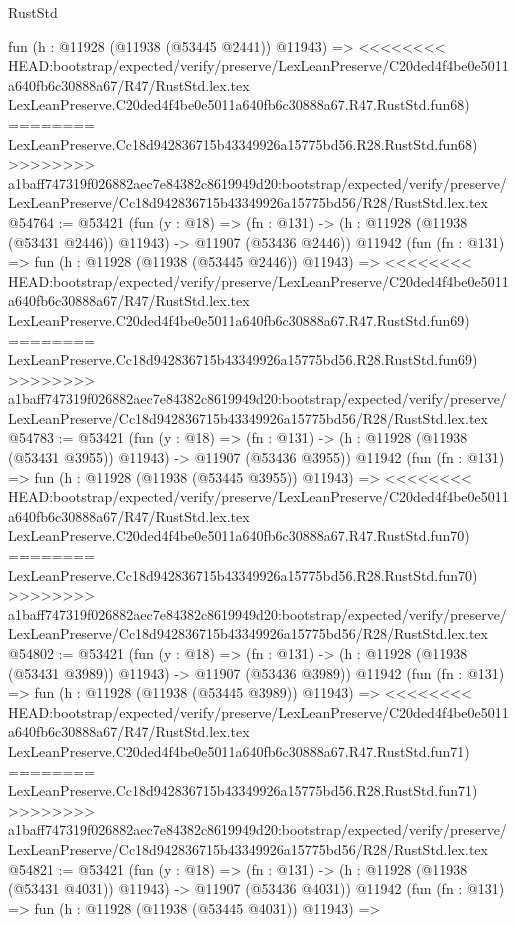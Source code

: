 \begin{lexlean}{RustStd}
\begin{coremodule}
{\begin{coremodule}
{{{{{{{{{{{{{{{{{{{{{{{{{{{{{{{{{{{{{{{{{{{{{{{{{{{{{{{{{{{{{{{{{{{{{{{{{{{{{{{{    fun (h : @11928 (@11938 (@53445 @2441)) @11943) =>
<<<<<<<< HEAD:bootstrap/expected/verify/preserve/LexLeanPreserve/C20ded4f4be0e5011a640fb6c30888a67/R47/RustStd.lex.tex
    LexLeanPreserve.C20ded4f4be0e5011a640fb6c30888a67.R47.RustStd.fun68)
========
    LexLeanPreserve.Cc18d942836715b43349926a15775bd56.R28.RustStd.fun68)
>>>>>>>> a1baff747319f026882aec7e84382c8619949d20:bootstrap/expected/verify/preserve/LexLeanPreserve/Cc18d942836715b43349926a15775bd56/R28/RustStd.lex.tex
@54764 := @53421
    (fun (y : @18) =>
    (fn : @131) -> (h : @11928 (@11938 (@53431 @2446)) @11943) -> @11907 (@53436 @2446))
    @11942
    (fun (fn : @131) =>
    fun (h : @11928 (@11938 (@53445 @2446)) @11943) =>
<<<<<<<< HEAD:bootstrap/expected/verify/preserve/LexLeanPreserve/C20ded4f4be0e5011a640fb6c30888a67/R47/RustStd.lex.tex
    LexLeanPreserve.C20ded4f4be0e5011a640fb6c30888a67.R47.RustStd.fun69)
========
    LexLeanPreserve.Cc18d942836715b43349926a15775bd56.R28.RustStd.fun69)
>>>>>>>> a1baff747319f026882aec7e84382c8619949d20:bootstrap/expected/verify/preserve/LexLeanPreserve/Cc18d942836715b43349926a15775bd56/R28/RustStd.lex.tex
@54783 := @53421
    (fun (y : @18) =>
    (fn : @131) -> (h : @11928 (@11938 (@53431 @3955)) @11943) -> @11907 (@53436 @3955))
    @11942
    (fun (fn : @131) =>
    fun (h : @11928 (@11938 (@53445 @3955)) @11943) =>
<<<<<<<< HEAD:bootstrap/expected/verify/preserve/LexLeanPreserve/C20ded4f4be0e5011a640fb6c30888a67/R47/RustStd.lex.tex
    LexLeanPreserve.C20ded4f4be0e5011a640fb6c30888a67.R47.RustStd.fun70)
========
    LexLeanPreserve.Cc18d942836715b43349926a15775bd56.R28.RustStd.fun70)
>>>>>>>> a1baff747319f026882aec7e84382c8619949d20:bootstrap/expected/verify/preserve/LexLeanPreserve/Cc18d942836715b43349926a15775bd56/R28/RustStd.lex.tex
@54802 := @53421
    (fun (y : @18) =>
    (fn : @131) -> (h : @11928 (@11938 (@53431 @3989)) @11943) -> @11907 (@53436 @3989))
    @11942
    (fun (fn : @131) =>
    fun (h : @11928 (@11938 (@53445 @3989)) @11943) =>
<<<<<<<< HEAD:bootstrap/expected/verify/preserve/LexLeanPreserve/C20ded4f4be0e5011a640fb6c30888a67/R47/RustStd.lex.tex
    LexLeanPreserve.C20ded4f4be0e5011a640fb6c30888a67.R47.RustStd.fun71)
========
    LexLeanPreserve.Cc18d942836715b43349926a15775bd56.R28.RustStd.fun71)
>>>>>>>> a1baff747319f026882aec7e84382c8619949d20:bootstrap/expected/verify/preserve/LexLeanPreserve/Cc18d942836715b43349926a15775bd56/R28/RustStd.lex.tex
@54821 := @53421
    (fun (y : @18) =>
    (fn : @131) -> (h : @11928 (@11938 (@53431 @4031)) @11943) -> @11907 (@53436 @4031))
    @11942
    (fun (fn : @131) =>
    fun (h : @11928 (@11938 (@53445 @4031)) @11943) =>
}}}}}}}}}}}}}}}}}}}}}}}}}}}}}}}}}}}}}}}}}}}}}}}}}}}}}}}}}}}}}}}}}}}}}}}}}}}}}}}}
\end{coremodule}}
\end{coremodule}
\end{lexlean}
